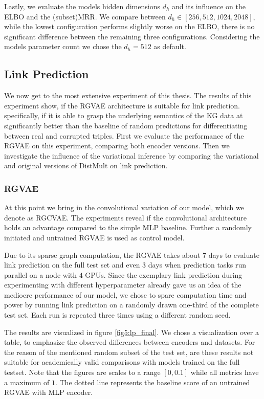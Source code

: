 Lastly, we evaluate the models hidden dimensions $d_h$ and its influence on the ELBO and the (subset)MRR. We compare between $d_h\in [256, 512, 1024, 2048]$, while the lowest configuration performs slightly worse on the ELBO, there is no significant difference between the remaining three configurations. Considering the models parameter count we chose the $d_h=512$ as default.


\subsection{Link Prediction}


 We now get to the most extensive experiment of this thesis. The results of this experiment show, if the RGVAE architecture is suitable for link prediction. specifically, if it is able to grasp the underlying semantics of the KG data at significantly better than the baseline of random predictions for differentiating between real and corrupted triples. First we evaluate the performance of the RGVAE on this experiment, comparing both encoder versions. Then we investigate the influence of the variational inference by comparing the variational and original versions of DistMult on link prediction.
 
 \subsubsection{RGVAE}

 At this point we bring in the convolutional variation of our model, which we denote as RGCVAE. The experiments reveal if the convolutional architecture holds an advantage compared to the simple MLP baseline. Further a randomly initiated and untrained RGVAE is used as control model.
 
 Due to its sparse graph computation, the RGVAE takes about 7 days to evaluate link prediction on the full test set and even 3 days when prediction tasks run parallel on a node with $4$ GPUs. Since the exemplary link prediction during experimenting with different hyperparameter already gave us an idea of the mediocre performance of our model, we chose to spare computation time and power by running link prediction on a randomly drawn one-third of the complete test set. Each run is repeated three times using a different random seed.

The results are visualized in figure \ref{fig5:lp_final}. We chose a visualization over a table, to emphasize the observed differences between encoders and datasets. For the reason of the mentioned random subset of the test set, are these results not suitable for academically valid comparisons with models trained on the full testset. Note that the figures are scales to a range $[0,0.1]$ while all metrics have a maximum of $1$. The dotted line represents the baseline score of an untrained RGVAE with MLP encoder.

